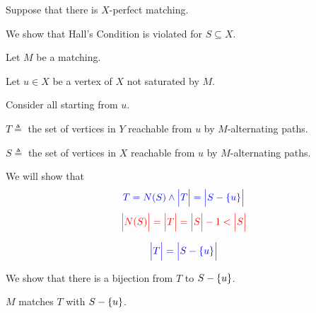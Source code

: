\begin{frame}{}
  \begin{center}

    \pause
    \vspace{0.30cm}
    Suppose that there is  $X$-perfect matching.

    \pause
    \vspace{0.20cm}
    We show that Hall's Condition is violated for  $S \subseteq X$.

    \pause

    \pause
    Let $M$ be a  matching.

    \pause
    \vspace{0.20cm}
    Let $u \in X$ be a vertex of $X$ not saturated by $M$.

    \pause
    \vspace{0.20cm}
    Consider all  starting from $u$.
  \end{center}
\end{frame}

\begin{frame}{}
  \begin{center}

    \vspace{0.50cm}
    $T \triangleq$ the set of vertices in $Y$ reachable from $u$ by $M$-alternating paths.

    \pause
    \vspace{0.20cm}
    $S \triangleq$ the set of vertices in $X$ reachable from $u$ by $M$-alternating paths.

    \pause
    \vspace{0.60cm}
    We will show that
    \[
      \textcolor{blue}{T = N(S) \land \Big\lvert T \Big\rvert = \Big\lvert S - \{u\} \Big\rvert}
    \]
    \pause
    \[
      \textcolor{red}{\Big\lvert N(S) \Big\rvert = \Big\lvert T \Big\rvert = \Big\lvert S \Big\rvert - 1 < \Big\lvert S \Big\rvert}
    \]
  \end{center}
\end{frame}

\begin{frame}{}
  \begin{center}
    \[
      \textcolor{blue}{\Big\lvert T \Big\rvert = \Big\lvert S - \{u\} \Big\rvert}
    \]

    \pause
    \vspace{0.30cm}
    We show that there is a bijection from $T$ to $S - \{u\}$.

    \pause
    \vspace{0.30cm}
    $M$ matches $T$ with $S - \{u\}$.
  \end{center}
\end{frame}

